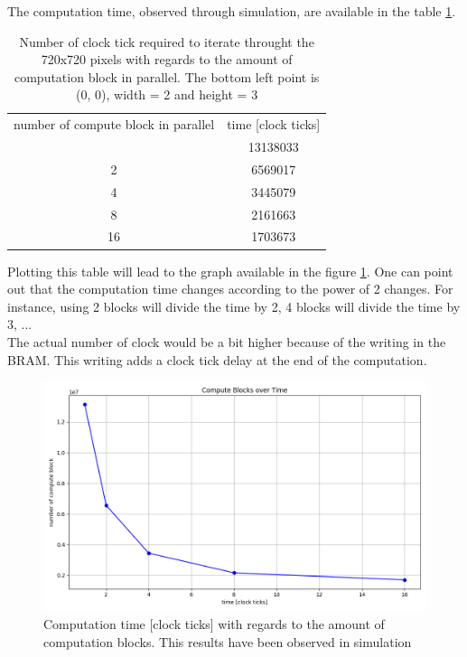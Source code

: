     The computation time, observed through simulation, are available in the table \ref{tab:result_time}.
    \begin{table}[H]
        \begin{center}
            \begin{tabular}{|c|c|}\hline
                number of compute block in parallel & time [clock ticks]\\\thickhline
                1  & 13138033 \\\hline
                2  & 6569017 \\\hline
                4  & 3445079 \\\hline
                8  & 2161663 \\\hline
                16 & 1703673 \\\hline
            \end{tabular}
            \caption{Number of clock tick required to iterate throught the 720x720 pixels with regards to the amount
                of computation block in parallel. The bottom left point is (0, 0), width = 2 and height = 3}
            \label{tab:result_time}
        \end{center}
    \end{table}
    Plotting this table will lead to the graph available in the figure \ref{fig:time_compute_results}.
    One can point out that the computation time changes according to the power of 2 changes.
    For instance, using 2 blocks will divide the time by 2, 4 blocks will divide the time by 3, ...\\
    The actual number of clock would be a bit higher because of the writing in the BRAM.
    This writing adds a clock tick delay at the end of the computation.
    \begin{figure}[H]
        \centering
        \includegraphics[width=0.8\linewidth]{images/time_compute_results.png}
        \caption{Computation time [clock ticks] with regards to the amount of computation blocks. This results
            have been observed in simulation}
        \label{fig:time_compute_results}
    \end{figure}
